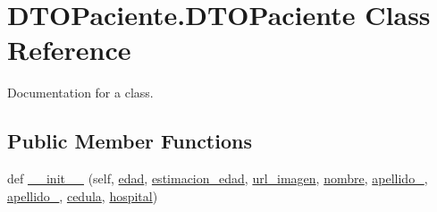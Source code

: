\hypertarget{class_d_t_o_paciente_1_1_d_t_o_paciente}{}\section{D\+T\+O\+Paciente.\+D\+T\+O\+Paciente Class Reference}
\label{class_d_t_o_paciente_1_1_d_t_o_paciente}


Documentation for a class.  


\subsection*{Public Member Functions}
\begin{DoxyCompactItemize}
\item 
def \mbox{\hyperlink{class_d_t_o_paciente_1_1_d_t_o_paciente_ae51dc8aed25bb089d13923edce9ece56}{\+\_\+\+\_\+init\+\_\+\+\_\+}} (self, \mbox{\hyperlink{class_d_t_o_paciente_1_1_d_t_o_paciente_a6c0a16c04f3f4f532dc3470daa7250d3}{edad}}, \mbox{\hyperlink{class_d_t_o_paciente_1_1_d_t_o_paciente_a282cdef74b37d69d0ed009291cdf9225}{estimacion\+\_\+edad}}, \mbox{\hyperlink{class_d_t_o_paciente_1_1_d_t_o_paciente_a6967d3ef12a5f519b23d4dc11791b0da}{url\+\_\+imagen}}, \mbox{\hyperlink{class_d_t_o_paciente_1_1_d_t_o_paciente_a3861795f8106322724f29363fdc9b906}{nombre}}, \mbox{\hyperlink{class_d_t_o_paciente_1_1_d_t_o_paciente_af7ca31ca9bedc6ba5d26a16417956946}{apellido\+\_}}, \mbox{\hyperlink{class_d_t_o_paciente_1_1_d_t_o_paciente_a46fe18fb40785e8b0632447286e54762}{apellido\+\_}}, \mbox{\hyperlink{class_d_t_o_paciente_1_1_d_t_o_paciente_a1801177d437a9d92e8ed39f69a336b8b}{cedula}}, \mbox{\hyperlink{class_d_t_o_paciente_1_1_d_t_o_paciente_af7d96afe885e6aae044cfbbac8c5ac52}{hospital}})
\end{DoxyCompactItemize}
